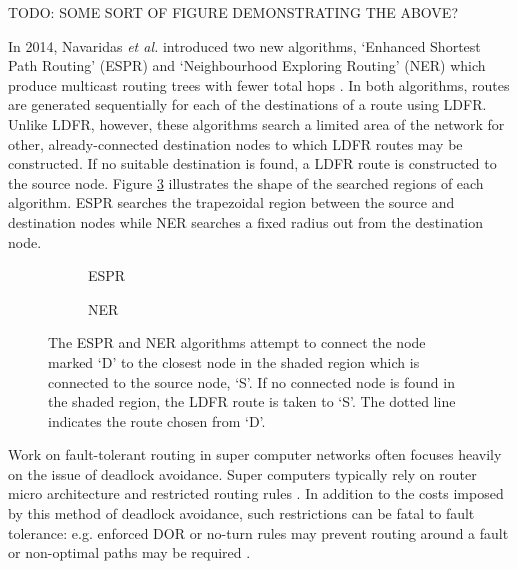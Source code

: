 		TODO: SOME SORT OF FIGURE DEMONSTRATING THE ABOVE?
		
		In 2014, Navaridas \emph{et al.} introduced two new algorithms, `Enhanced
		Shortest Path Routing' (ESPR) and `Neighbourhood Exploring Routing' (NER)
		which produce multicast routing trees with fewer total hops
		\cite{navaridas14}. In both algorithms, routes are generated sequentially
		for each of the destinations of a route using LDFR. Unlike LDFR, however,
		these algorithms search a limited area of the network for other,
		already-connected destination nodes to which LDFR routes may be
		constructed. If no suitable destination is found, a LDFR route is
		constructed to the source node. Figure \ref{fig:search-regions} illustrates
		the shape of the searched regions of each algorithm. ESPR searches the
		trapezoidal region between the source and destination nodes while NER
		searches a fixed radius out from the destination node.
		
		\begin{figure}
			\center
			\begin{subfigure}{0.45\linewidth}
				\center
				
				\caption{ESPR}
				\label{fig:search-regions-espr}
			\end{subfigure}
			\begin{subfigure}{0.45\linewidth}
				\center
				
				\caption{NER}
				\label{fig:search-regions-espr}
			\end{subfigure}
			
			\caption{The ESPR and NER algorithms attempt to connect the node marked
			`D' to the closest node in the shaded region which is connected to the
			source node, `S'. If no connected node is found in the shaded region, the
			LDFR route is taken to `S'. The dotted line indicates the route chosen
			from `D'.}
			\label{fig:search-regions}
		\end{figure}
		
		Work on fault-tolerant routing in super computer networks often focuses
		heavily on the issue of deadlock avoidance. Super computers typically rely
		on router micro architecture and restricted routing rules \cite{dally93}.
		In addition to the costs imposed by this method of deadlock avoidance, such
		restrictions can be fatal to fault tolerance: e.g. enforced DOR or no-turn
		rules may prevent routing around a fault or non-optimal paths may be
		required \cite{dally04}.
		
